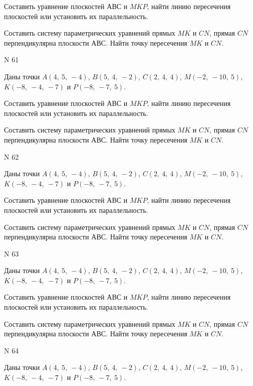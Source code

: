 \documentclass[11pt]{report}
\begin{document}
Составить уравнение плоскостей $АВС$ и $MKP$,
найти линию пересечения плоскостей или установить их параллельность.

Составить систему параметрических уравнений прямых $MK$ и $CN$,
прямая $CN$ перпендикулярна плоскости $АВС$. 
Найти точку пересечения $MK$ и $CN$.



 N 61

Даны точки $A\left( 4, \  5, \  -4\right)$, $B\left( 5, \  4, \  -2\right)$, $C\left( 2, \  4, \  4\right)$, $M\left( -2, \  -10, \  5\right)$, $K\left( -8, \  -4, \  -7\right)$ и $P\left( -8, \  -7, \  5\right)$.


Составить уравнение плоскостей $АВС$ и $MKP$,
найти линию пересечения плоскостей или установить их параллельность.

Составить систему параметрических уравнений прямых $MK$ и $CN$,
прямая $CN$ перпендикулярна плоскости $АВС$. 
Найти точку пересечения $MK$ и $CN$.



 N 62

Даны точки $A\left( 4, \  5, \  -4\right)$, $B\left( 5, \  4, \  -2\right)$, $C\left( 2, \  4, \  4\right)$, $M\left( -2, \  -10, \  5\right)$, $K\left( -8, \  -4, \  -7\right)$ и $P\left( -8, \  -7, \  5\right)$.


Составить уравнение плоскостей $АВС$ и $MKP$,
найти линию пересечения плоскостей или установить их параллельность.

Составить систему параметрических уравнений прямых $MK$ и $CN$,
прямая $CN$ перпендикулярна плоскости $АВС$. 
Найти точку пересечения $MK$ и $CN$.



 N 63

Даны точки $A\left( 4, \  5, \  -4\right)$, $B\left( 5, \  4, \  -2\right)$, $C\left( 2, \  4, \  4\right)$, $M\left( -2, \  -10, \  5\right)$, $K\left( -8, \  -4, \  -7\right)$ и $P\left( -8, \  -7, \  5\right)$.


Составить уравнение плоскостей $АВС$ и $MKP$,
найти линию пересечения плоскостей или установить их параллельность.

Составить систему параметрических уравнений прямых $MK$ и $CN$,
прямая $CN$ перпендикулярна плоскости $АВС$. 
Найти точку пересечения $MK$ и $CN$.



 N 64

Даны точки $A\left( 4, \  5, \  -4\right)$, $B\left( 5, \  4, \  -2\right)$, $C\left( 2, \  4, \  4\right)$, $M\left( -2, \  -10, \  5\right)$, $K\left( -8, \  -4, \  -7\right)$ и $P\left( -8, \  -7, \  5\right)$.
\end{document}
